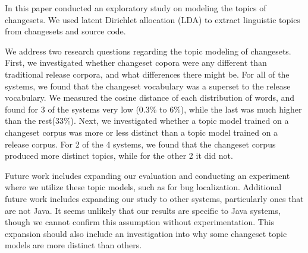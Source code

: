 
In this paper conducted an exploratory study on modeling the topics of
changesets.
We used latent Dirichlet allocation (LDA) to extract linguistic
topics from changesets and source code.

We address two research questions regarding the topic modeling of changesets.
First, we investigated whether changeset copora were any different than
traditional release corpora, and what differences there might be.
For all of the systems, we found that the changeset vocabulary was a superset
to the release vocabulary.
We measured the cosine distance of each distribution of words,
and found for 3 of the systems very low (0.3\% to 6\%),
while the last was much higher than the rest(33\%).
Next, we investigated whether a topic model trained on a changeset corpus
was more or less distinct than a topic model trained on a release corpus.
For 2 of the 4 systems, we found that the changeset corpus produced more
distinct topics, while for the other 2 it did not.


Future work includes expanding our evaluation and conducting an experiment
where we utilize these topic models, such as for bug localization.
Additional future work includes expanding our study to other systems, particularly ones that are not Java.
It seems unlikely that our results are specific to Java systems, though we cannot confirm this assumption without experimentation.
This expansion should also include an investigation into why some
changeset topic models are more distinct than others.
 

